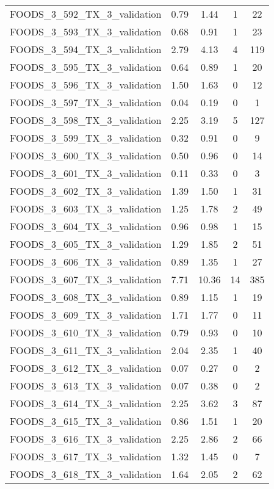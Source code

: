 \begin{table}
\begin{tabular}{|l|c|c|c|c|}
FOODS\_3\_592\_TX\_3\_validation & 0.79 & 1.44 & 1 & 22 \\
FOODS\_3\_593\_TX\_3\_validation & 0.68 & 0.91 & 1 & 23 \\
FOODS\_3\_594\_TX\_3\_validation & 2.79 & 4.13 & 4 & 119 \\
FOODS\_3\_595\_TX\_3\_validation & 0.64 & 0.89 & 1 & 20 \\
FOODS\_3\_596\_TX\_3\_validation & 1.50 & 1.63 & 0 & 12 \\
FOODS\_3\_597\_TX\_3\_validation & 0.04 & 0.19 & 0 & 1 \\
FOODS\_3\_598\_TX\_3\_validation & 2.25 & 3.19 & 5 & 127 \\
FOODS\_3\_599\_TX\_3\_validation & 0.32 & 0.91 & 0 & 9 \\
FOODS\_3\_600\_TX\_3\_validation & 0.50 & 0.96 & 0 & 14 \\
FOODS\_3\_601\_TX\_3\_validation & 0.11 & 0.33 & 0 & 3 \\
FOODS\_3\_602\_TX\_3\_validation & 1.39 & 1.50 & 1 & 31 \\
FOODS\_3\_603\_TX\_3\_validation & 1.25 & 1.78 & 2 & 49 \\
FOODS\_3\_604\_TX\_3\_validation & 0.96 & 0.98 & 1 & 15 \\
FOODS\_3\_605\_TX\_3\_validation & 1.29 & 1.85 & 2 & 51 \\
FOODS\_3\_606\_TX\_3\_validation & 0.89 & 1.35 & 1 & 27 \\
FOODS\_3\_607\_TX\_3\_validation & 7.71 & 10.36 & 14 & 385 \\
FOODS\_3\_608\_TX\_3\_validation & 0.89 & 1.15 & 1 & 19 \\
FOODS\_3\_609\_TX\_3\_validation & 1.71 & 1.77 & 0 & 11 \\
FOODS\_3\_610\_TX\_3\_validation & 0.79 & 0.93 & 0 & 10 \\
FOODS\_3\_611\_TX\_3\_validation & 2.04 & 2.35 & 1 & 40 \\
FOODS\_3\_612\_TX\_3\_validation & 0.07 & 0.27 & 0 & 2 \\
FOODS\_3\_613\_TX\_3\_validation & 0.07 & 0.38 & 0 & 2 \\
FOODS\_3\_614\_TX\_3\_validation & 2.25 & 3.62 & 3 & 87 \\
FOODS\_3\_615\_TX\_3\_validation & 0.86 & 1.51 & 1 & 20 \\
FOODS\_3\_616\_TX\_3\_validation & 2.25 & 2.86 & 2 & 66 \\
FOODS\_3\_617\_TX\_3\_validation & 1.32 & 1.45 & 0 & 7 \\
FOODS\_3\_618\_TX\_3\_validation & 1.64 & 2.05 & 2 & 62 \\

\end{tabular}
\end{table}
